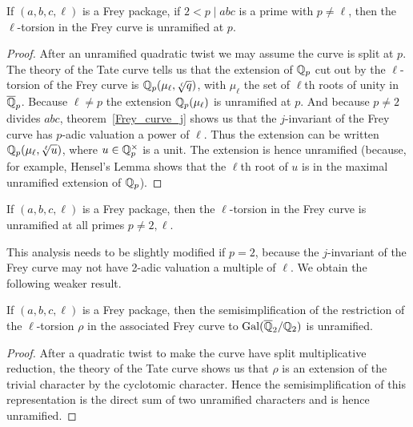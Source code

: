 \begin{corollary}\label{Frey_curve_unram} If $(a,b,c,\ell)$ is a Frey package, if $2<p\mid abc$
  is a prime with $p\not=\ell$, then the $\ell$-torsion in the Frey curve is unramified
  at $p$.
\end{corollary}
\begin{proof} After an unramified quadratic twist we may assume the curve is split at $p$.
  The theory of the Tate curve tells us that the extension of $\mathbb{Q}_p$ cut out by the $\ell$-torsion
  of the Frey curve is $\mathbb{Q}_p(\mu_\ell,\sqrt[\ell]{q})$, with $\mu_\ell$ the set of $\ell$th roots
  of unity in $\overline{\mathbb{Q}}_p$. Because $\ell\not=p$ the extension
  $\mathbb{Q}_p(\mu_\ell)$ is unramified at $p$. And because $p\not=2$ divides $abc$, 
  theorem~\ref{Frey_curve_j} shows us that the $j$-invariant of the Frey curve has $p$-adic
  valuation a power of $\ell$. Thus the extension can be written $\mathbb{Q}_p(\mu_\ell,\sqrt[\ell]{u})$,
  where $u\in\mathbb{Q}_p^\times$ is a unit. The extension is hence unramified (because, for example,
  Hensel's Lemma shows that the $\ell$th root of $u$ is in the maximal unramified
  extension of $\mathbb{Q}_p$).
\end{proof}

\begin{corollary}\label{frey_curve_unramified} If $(a,b,c,\ell)$ is a Frey package, then the $\ell$-torsion in the Frey curve is unramified at all primes $p\not=2,\ell$.
\end{corollary}

This analysis needs to be slightly modified if $p=2$, because the $j$-invariant of
the Frey curve may not have 2-adic valuation a multiple of $\ell$. We obtain the
following weaker result.

\begin{corollary}\label{frey_curve_at_2} If $(a,b,c,\ell)$ is a Frey package, then the 
  semisimplification of the restriction of the $\ell$-torsion $\rho$ in the associated Frey curve 
  to $\operatorname{Gal}(\overline{\mathbb{Q}}_2/\mathbb{Q}_2)$ is unramified.
\end{corollary}
\begin{proof} After a quadratic twist to make the curve have split multiplicative
  reduction, the theory of the Tate curve shows us that $\rho$ is an extension
  of the trivial character by the cyclotomic character. Hence the semisimplification of this representation is the direct sum of two
  unramified characters and is hence unramified.
\end{proof}

